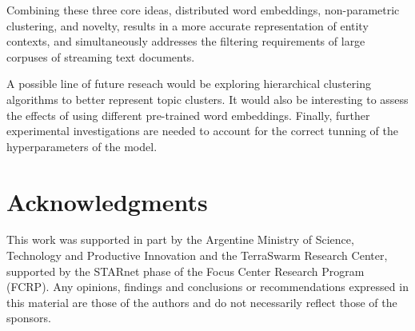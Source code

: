 \documentclass{article}
\begin{document}
Combining these three core ideas, distributed word embeddings, non-parametric clustering, and novelty, results in a more accurate representation of entity contexts, and simultaneously addresses the filtering requirements of large corpuses of streaming text documents.

A possible line of future reseach would be exploring hierarchical clustering algorithms to better represent topic clusters. It would also be interesting to assess the effects of using different pre-trained word embeddings. Finally, further experimental investigations are needed to account for the correct tunning of the hyperparameters of the model.

\section*{Acknowledgments} 
 
This work was supported in part by the Argentine Ministry of Science, Technology and Productive Innovation and the TerraSwarm Research Center, supported by the STARnet phase of the Focus Center Research Program (FCRP). Any opinions, findings and conclusions or recommendations expressed in this material are those of the authors and do not necessarily reflect those of the sponsors.



\end{document}

